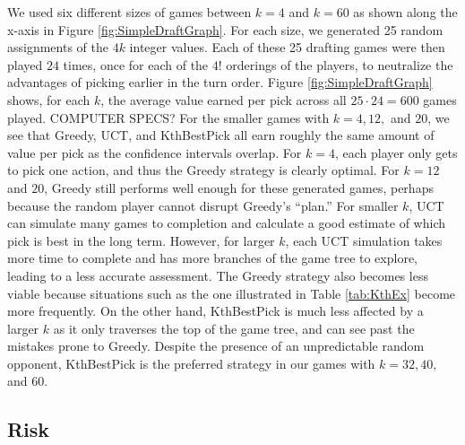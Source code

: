 \documentclass[letterpaper]{article}
\numberwithin{equation}{section}
\numberwithin{theorem}{section}
\numberwithin{lemma}{section}
\numberwithin{df}{section}
\begin{document}
We used six different sizes of games between $k=4$ and $k=60$ as shown along the x-axis in Figure \ref{fig:SimpleDraftGraph}.  For each size, we generated 25 random assignments of the $4k$ integer values.  Each of these 25 drafting games were then played $24$ times, once for each of the $4!$ orderings of the players, to neutralize the advantages of picking earlier in the turn order.  Figure \ref{fig:SimpleDraftGraph} shows, for each $k$, the average value earned per pick across all $25 \cdot 24 = 600$ games played.  COMPUTER SPECS?  For the smaller games with $k=4,12,$ and $20$, we see that Greedy, UCT, and KthBestPick all earn roughly the same amount of value per pick as the confidence intervals overlap.  For $k=4$, each player only gets to pick one action, and thus the Greedy strategy is clearly optimal.  For $k=12$ and $20$, Greedy still performs well enough for these generated games, perhaps because the random player cannot disrupt Greedy's ``plan.''  For smaller $k$, UCT can simulate many games to completion and calculate a good estimate of which pick is best in the long term.  However, for larger $k$, each UCT simulation takes more time to complete and has more branches of the game tree to explore, leading to a less accurate assessment.  The Greedy strategy also becomes less viable because situations such as the one illustrated in Table \ref{tab:KthEx} become more frequently.  On the other hand, KthBestPick is much less affected by a larger $k$ as it only traverses the top of the game tree, and can see past the mistakes prone to Greedy.  Despite the presence of an unpredictable random opponent, KthBestPick is the preferred strategy in our games with $k=32,40,$ and $60$.

\subsection{Risk}
\end{document}
